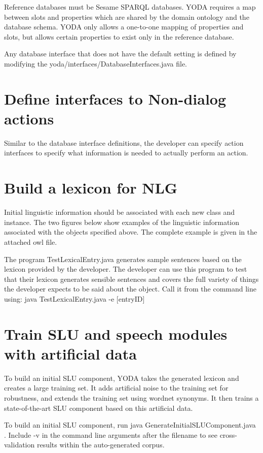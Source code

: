 \documentclass[10pt]{article}
\begin{document}
Reference databases must be Sesame SPARQL databases.
YODA requires a map between slots and properties which are shared by the domain ontology and the database schema.
YODA only allows a one-to-one mapping of properties and slots, but allows certain properties to exist only in the reference database.

Any database interface that does not have the default setting is defined by modifying the yoda/interfaces/DatabaseInterfaces.java file.


\section {Define interfaces to Non-dialog actions}
Similar to the database interface definitions, the developer can specify action interfaces to specify what information is needed to actually perform an action.

\section {Build a lexicon for NLG}
Initial linguistic information should be associated with each new class and instance.
The two figures below show examples of the linguistic information associated with the objects specified above.
The complete example is given in the attached owl file.

The program TestLexicalEntry.java generates sample sentences based on the lexicon provided by the developer.
The developer can use this program to test that their lexicon generates sensible sentences and covers the full variety of things the developer expects to be said about the object.
Call it from the command line using: java TestLexicalEntry.java -e [entryID]


\section {Train SLU and speech modules with artificial data}

To build an initial SLU component, YODA takes the generated lexicon and creates a large training set.
It adds artificial noise to the training set for robustness, and extends the training set using wordnet synonyms.
It then trains a state-of-the-art SLU component based on this artificial data.

To build an initial SLU component, run java GenerateInitialSLUComponent.java .
Include -v in the command line arguments after the filename to see cross-validation results within the auto-generated corpus.
\end{document}
